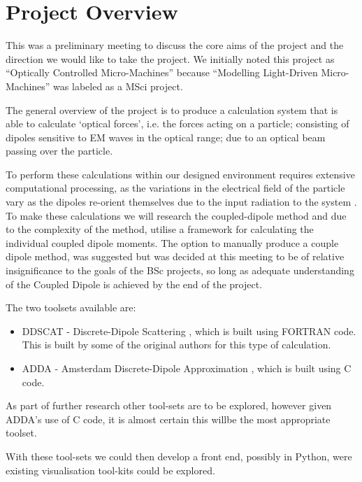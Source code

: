 \documentclass[11pt]{meetingmins}
\begin{document}
\maketitle

\section{Project Overview}

This was a preliminary meeting to discuss the core aims of the project and the direction we would like to take the project. We initially noted this project as ``Optically Controlled Micro-Machines'' because ``Modelling Light-Driven Micro-Machines'' was labeled as a MSci project.

The general overview of the project is to produce a calculation system that is able to calculate `optical forces', i.e. the forces acting on a particle; consisting of dipoles sensitive to EM waves in the optical range; due to an optical beam passing over the particle.

To perform these calculations within our designed environment requires extensive computational processing, as the variations in the electrical field of the particle vary as the dipoles re-orient themselves due to the input radiation to the system \cite{Ref1}. To make these calculations we will research the coupled-dipole method \cite{Ref2} and due to the complexity of the method, utilise a framework for calculating the individual coupled dipole moments. The option to manually produce a couple dipole method, was suggested but was decided at this meeting to be of relative insignificance to the goals of the BSc projects, so long as adequate understanding of the Coupled Dipole is achieved by the end of the project.

The two toolsets available are:
\begin{itemize}
\item DDSCAT - Discrete-Dipole Scattering \cite{Ref3}, which is built using FORTRAN code. This is built by some of the original authors for this type of calculation.
\item ADDA - Amsterdam Discrete-Dipole Approximation \cite{Ref4}, which is built using C code.
\end{itemize}

As part of further research other tool-sets are to be explored, however given ADDA's \cite{Ref4} use of C code, it is almost certain this willbe the most appropriate toolset.

With these tool-sets we could then develop a front end, possibly in Python, were existing visualisation tool-kits could be explored.
\end{document}
